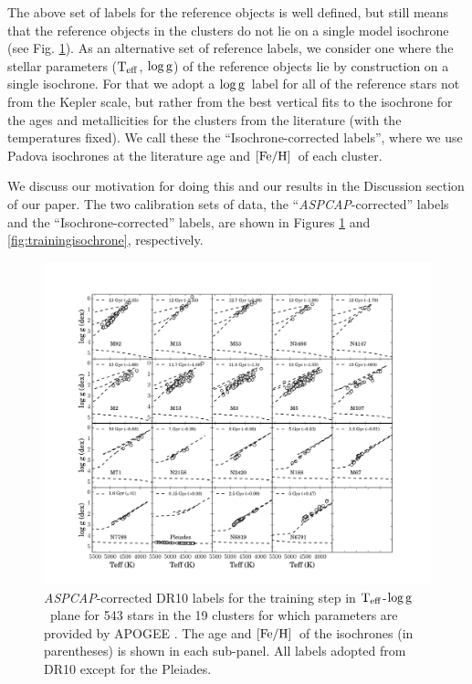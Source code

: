 \documentclass[12pt, preprint]{aastex}
\newcommand{\teff}{\mbox{$\rm T_{eff}$}}
\newcommand{\feh}{\mbox{$\rm [Fe/H]$}}
\newcommand{\logg}{\mbox{$\rm \log g$}}
\newcommand{\aspcap}{\textsl{ASPCAP}}
\begin{document}


The above set of labels for the reference objects is well defined, but still means that the reference objects in the clusters do not lie on a single model isochrone 
(see Fig. \ref{fig:trainingaspcap}). 
As an alternative set of reference labels, we consider one where the stellar parameters (\teff , \logg ) of the reference objects lie by construction on a single isochrone. 
For that we adopt a \logg\ label for all of the reference stars not from the Kepler scale, but rather from the best vertical fits to the isochrone for the ages and metallicities for the clusters from the literature (with the temperatures fixed). We call these the ``Isochrone-corrected labels'', where we use Padova isochrones at the literature age and \feh\ of each cluster. 

We discuss our motivation for doing this and our results in the Discussion section of our paper.  
The two calibration sets of data, the ``\aspcap-corrected'' labels and the ``Isochrone-corrected'' labels, are shown in Figures \ref{fig:trainingaspcap} and \ref{fig:trainingisochrone}, respectively. 

\begin{figure}[h!]
\centering
    \includegraphics[scale=0.33]{./plots/training_aspcap.pdf}
\caption{\aspcap-corrected DR10 labels  for the training step in \teff-\logg\ plane for 543 stars in the 19 clusters for which parameters are provided by APOGEE \citep{Meszaros2013}. The age and \feh\ of the isochrones (in parentheses) is shown in each sub-panel. All labels adopted from DR10 except for the Pleiades. }
\label{fig:trainingaspcap}
\end{figure}
\end{document}
